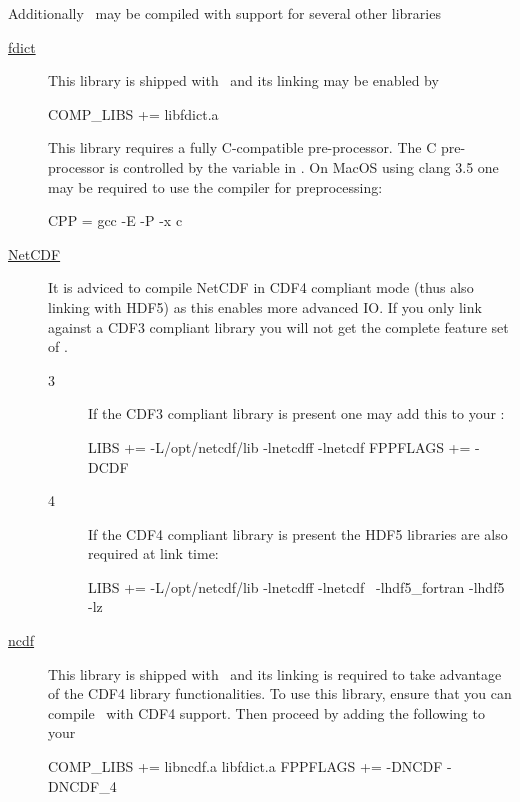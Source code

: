 Additionally \siesta\ may be compiled with support for several other
libraries
\begin{description}

  \item[\href{https://github.com/zerothi/fdict}{fdict}] %
  This library is shipped with \siesta\ and its linking may be enabled
  by 
  \begin{shellexample}
    COMP_LIBS += libfdict.a
  \end{shellexample}
  This library requires a fully C-compatible pre-processor. The C
  pre-processor is controlled by the  variable in
  . 
  On MacOS using clang 3.5 one may be required to use the 
  compiler for preprocessing:
  \begin{shellexample}
    CPP = gcc -E -P -x c
  \end{shellexample}


  \item[\href{https://www.unidata.ucar.edu/software/netcdf}{NetCDF}] %
  It is adviced to compile NetCDF in CDF4 compliant mode (thus
  also linking with HDF5) as this enables more advanced IO. If you
  only link against a CDF3 compliant library you will not get the
  complete feature set of \siesta.

  \begin{description}
    \item[3]%
    If the CDF3 compliant library is present one may add this to
    your :
\begin{shellexample}
  LIBS += -L/opt/netcdf/lib -lnetcdff -lnetcdf
  FPPFLAGS += -DCDF
\end{shellexample}

    \item[4]%
    If the CDF4 compliant library is present the HDF5 libraries
    are also required at link time:
\begin{shellexample}
  LIBS += -L/opt/netcdf/lib -lnetcdff -lnetcdf \
            -lhdf5_fortran -lhdf5 -lz
\end{shellexample}

  \end{description}

  
  \item[\href{https://github.com/zerothi/ncdf}{ncdf}] %
  This library is shipped with \siesta\ and its linking is required to
  take advantage of the CDF4 library functionalities. To use this
  library, ensure that you can compile \siesta\ with CDF4
  support. Then proceed by adding the following to your 
  \begin{shellexample}
    COMP_LIBS += libncdf.a libfdict.a
    FPPFLAGS += -DNCDF -DNCDF_4
  \end{shellexample}


\end{description}
